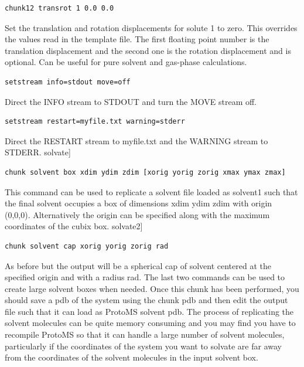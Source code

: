 \documentclass[letterpaper,10pt,english]{sphinxmanual}
\begin{document}
\begin{Verbatim}[frame=single,commandchars=\\\{\}]
chunk12 transrot 1 0.0 0.0
\end{Verbatim}

Set the translation and rotation displacements for solute 1 to zero. This overrides the values read in the template file. The first floating point number is the translation displacement and the second one is the rotation displacement and is optional. Can be useful for pure solvent and gas-phase calculations.

\begin{Verbatim}[frame=single,commandchars=\\\{\}]
setstream info=stdout move=off
\end{Verbatim}

Direct the INFO stream to STDOUT and turn the MOVE stream off.

\begin{Verbatim}[frame=single,commandchars=\\\{\}]
setstream restart=myfile.txt warning=stderr
\end{Verbatim}

Direct the RESTART stream to myfile.txt and the WARNING stream to STDERR. solvate{]}

\begin{Verbatim}[frame=single,commandchars=\\\{\}]
chunk solvent box xdim ydim zdim [xorig yorig zorig xmax ymax zmax]
\end{Verbatim}

This command can be used to replicate a solvent file loaded as solvent1 such that the final solvent occupies a box of dimensions xdim ydim zdim with origin (0,0,0). Alternatively the origin can be specified along with the maximum coordinates of the cubix box. solvate2{]}

\begin{Verbatim}[frame=single,commandchars=\\\{\}]
chunk solvent cap xorig yorig zorig rad
\end{Verbatim}

As before but the output will be a spherical cap of solvent centered at the specified origin and with a radius rad. The last two commands can be used to create large solvent boxes when needed. Once this chunk has been performed, you should save a pdb of the system using the chunk pdb and then edit the output file such that it can load as ProtoMS solvent pdb. The process of replicating the solvent molecules can be quite memory consuming and you may find you have to recompile ProtoMS so that it can handle a large number of solvent molecules, particularly if the coordinates of the system you want to solvate are far away from the coordinates of the solvent molecules in the input solvent box.
\end{document}
